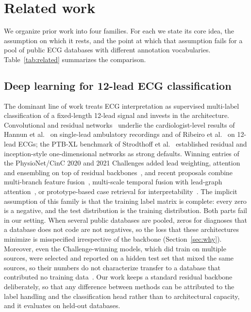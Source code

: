\section{Related work}\label{sec:related}

We organize prior work into four families. For each we state its core idea, the assumption on which it rests, and the point at which that assumption fails for a pool of public ECG databases with different annotation vocabularies. Table~\ref{tab:related} summarizes the comparison.

\subsection{Deep learning for 12-lead ECG classification}\label{sec:rel_arch}
The dominant line of work treats ECG interpretation as supervised multi-label classification of a fixed-length 12-lead signal and invests in the architecture. Convolutional and residual networks~\cite{he2016,hu2018se} underlie the cardiologist-level results of Hannun et al.~\cite{hannun2019} on single-lead ambulatory recordings and of Ribeiro et al.~\cite{ribeiro2020} on 12-lead ECGs; the PTB-XL benchmark of Strodthoff et al.~\cite{strodthoff2021} established residual and inception-style one-dimensional networks as strong defaults. Winning entries of the PhysioNet/CinC 2020 and 2021 Challenges added lead weighting, attention and ensembling on top of residual backbones~\cite{zhao2020cinc,nejedly2021}, and recent proposals combine multi-branch feature fusion~\cite{sharan2025}, multi-scale temporal fusion with lead-graph attention~\cite{zhou_leadgraph2026}, or prototype-based case retrieval for interpretability~\cite{sethi2025proto}. The implicit assumption of this family is that the training label matrix is complete: every zero is a negative, and the test distribution is the training distribution. Both parts fail in our setting. When several public databases are pooled, zeros for diagnoses that a database does not code are not negatives, so the loss that these architectures minimize is misspecified irrespective of the backbone (Section~\ref{sec:why}). Moreover, even the Challenge-winning models, which did train on multiple sources, were selected and reported on a hidden test set that mixed the same sources, so their numbers do not characterize transfer to a database that contributed no training data~\cite{reyna2022}. Our work keeps a standard residual backbone deliberately, so that any difference between methods can be attributed to the label handling and the classification head rather than to architectural capacity, and it evaluates on held-out databases.

